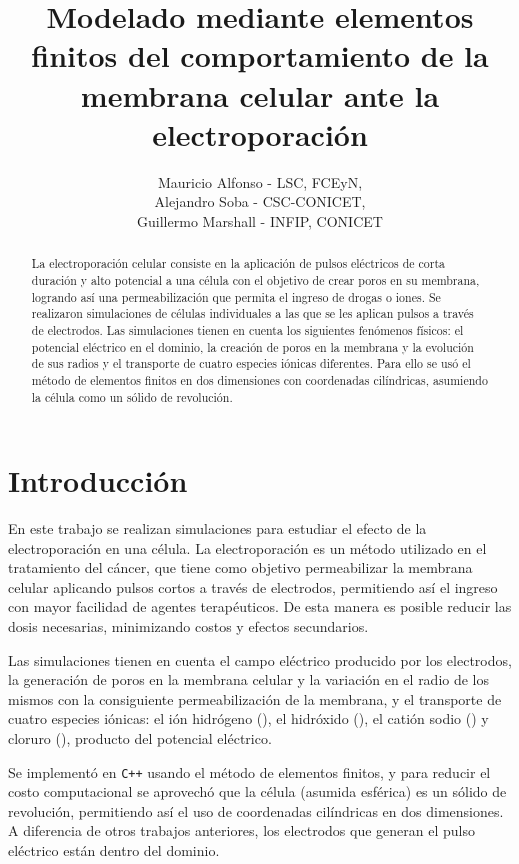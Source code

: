 \documentclass[11pt, twocolumn]{article}
\title{Modelado mediante elementos finitos del comportamiento de la membrana celular ante la electroporación}
\author{Mauricio Alfonso - LSC, FCEyN, \\Alejandro Soba - CSC-CONICET, \\Guillermo Marshall - INFIP, CONICET}
\begin{document}
\newcommand{\h}{\ce{H^+}}
\newcommand{\oh}{\ce{OH^-}}
\newcommand{\na}{\ce{Na^+}}
\newcommand{\cl}{\ce{Cl^-}}
\newcommand{\kvm}{$\si{\kilo\volt\per\metre}$}
\newcommand{\usec}{$\si{\micro\second}$}

\maketitle


\begin{abstract}
	La electroporación celular consiste en la aplicación de pulsos eléctricos de corta duración y alto potencial a una célula con el objetivo de crear poros en su membrana, logrando así una permeabilización que permita el ingreso de drogas o iones. Se realizaron simulaciones de células individuales a las que se les aplican pulsos a través de electrodos. Las simulaciones tienen en cuenta los siguientes fenómenos físicos: el potencial eléctrico en el dominio, la creación de poros en la membrana y la evolución de sus radios y el transporte de cuatro especies iónicas diferentes. Para ello se usó el método de elementos finitos en dos dimensiones con coordenadas cilíndricas, asumiendo la célula como un sólido de revolución.
	
\end{abstract}

\section{Introducción}
En este trabajo se realizan simulaciones para estudiar el efecto de la electroporación en una célula. La electroporación es un método utilizado en el tratamiento del cáncer, que tiene como objetivo permeabilizar la membrana celular aplicando pulsos cortos a través de electrodos, permitiendo así el ingreso con mayor facilidad de agentes terapéuticos. De esta manera es posible reducir las dosis necesarias, minimizando costos y efectos secundarios.

Las simulaciones tienen en cuenta el campo eléctrico producido por los electrodos, la generación de poros en la membrana celular y la variación en el radio de los mismos con la consiguiente permeabilización de la membrana, y el transporte de cuatro especies iónicas: el ión hidrógeno (\h), el hidróxido (\oh), el catión sodio (\na) y cloruro (\cl), producto del potencial eléctrico.

Se implementó en \texttt{C++} usando el método de elementos finitos, y para reducir el costo computacional se aprovechó que la célula (asumida esférica) es un sólido de revolución, permitiendo así el uso de coordenadas cilíndricas en dos dimensiones. A diferencia de otros trabajos anteriores, los electrodos que generan el pulso eléctrico están dentro del dominio.
\end{document}
